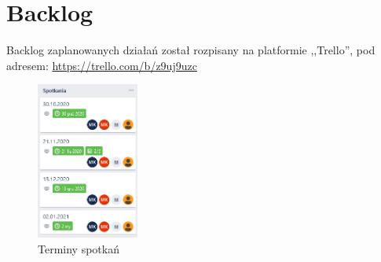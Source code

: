 \documentclass[12pt,a4paper]{article}
\begin{document}
	\section{Backlog}
		\indent Backlog zaplanowanych działań został rozpisany na platformie ,,Trello'', pod adresem: \url{https://trello.com/b/z9uj9uzc}
		\newline
		\begin{figure}[H]
			\centering
			\includegraphics[width=0.3\textwidth]{img/spotkania.png}
			\caption{Terminy spotkań}
			\label{fig:trello-spotkania}
		\end{figure}
		
	\newpage
	
\end{document}
